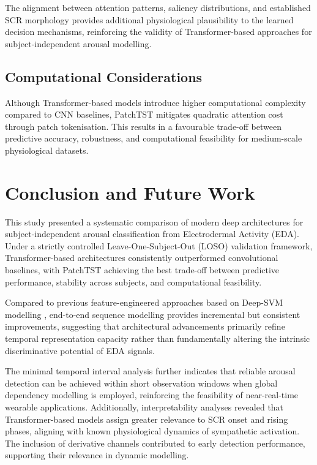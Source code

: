 \documentclass[runningheads]{llncs}
\begin{document}
The alignment between attention patterns, saliency distributions, and established SCR morphology provides additional physiological plausibility to the learned decision mechanisms, reinforcing the validity of Transformer-based approaches for subject-independent arousal modelling.

\subsection{Computational Considerations}

Although Transformer-based models introduce higher computational complexity compared to CNN baselines, PatchTST mitigates quadratic attention cost through patch tokenisation. This results in a favourable trade-off between predictive accuracy, robustness, and computational feasibility for medium-scale physiological datasets.


\section{Conclusion and Future Work}

This study presented a systematic comparison of modern deep architectures for subject-independent arousal classification from Electrodermal Activity (EDA). Under a strictly controlled Leave-One-Subject-Out (LOSO) validation framework, Transformer-based architectures consistently outperformed convolutional baselines, with PatchTST achieving the best trade-off between predictive performance, stability across subjects, and computational feasibility.

Compared to previous feature-engineered approaches based on Deep-SVM modelling \cite{sanchez2020deep}, end-to-end sequence modelling provides incremental but consistent improvements, suggesting that architectural advancements primarily refine temporal representation capacity rather than fundamentally altering the intrinsic discriminative potential of EDA signals.

The minimal temporal interval analysis further indicates that reliable arousal detection can be achieved within short observation windows when global dependency modelling is employed, reinforcing the feasibility of near-real-time wearable applications. Additionally, interpretability analyses revealed that Transformer-based models assign greater relevance to SCR onset and rising phases, aligning with known physiological dynamics of sympathetic activation. The inclusion of derivative channels contributed to early detection performance, supporting their relevance in dynamic modelling.
\end{document}
